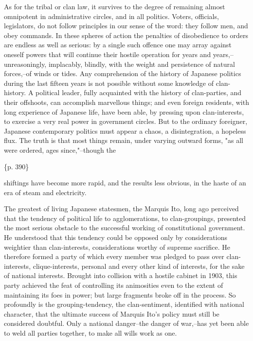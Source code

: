 As for the tribal or clan law, it survives to the degree of remaining almost omnipotent in administrative circles, and in all politics. Voters, officials, legislators, do not follow principles in our sense of the word: they follow men, and obey commands. In these spheres of action the penalties of disobedience to orders are endless as well as serious: by a single such offence one may array against oneself powers that will continue their hostile operation for years and years,--unreasoningly, implacably, blindly, with the weight and persistence of natural forces,--of winds or tides. Any comprehension of the history of Japanese politics during the last fifteen years is not possible without some knowledge of clan-history. A political leader, fully acquainted with the history of clan-parties, and their offshoots, can accomplish marvellous things; and even foreign residents, with long experience of Japanese life, have been able, by pressing upon clan-interests, to exercise a very real power in government circles. But to the ordinary foreigner, Japanese contemporary politics must appear a chaos, a disintegration, a hopeless flux. The truth is that most things remain, under varying outward forms, "as all were ordered, ages since,"--though the

\{p. 390\}

shiftings have become more rapid, and the results less obvious, in the haste of an era of steam and electricity.

The greatest of living Japanese statesmen, the Marquis Ito, long ago perceived that the tendency of political life to agglomerations, to clan-groupings, presented the most serious obstacle to the successful working of constitutional government. He understood that this tendency could be opposed only by considerations weightier than clan-interests, considerations worthy of supreme sacrifice. He therefore formed a party of which every member was pledged to pass over clan-interests, clique-interests, personal and every other kind of interests, for the sake of national interests. Brought into collision with a hostile cabinet in 1903, this party achieved the feat of controlling its animosities even to the extent of maintaining its foes in power; but large fragments broke off in the process. So profoundly is the grouping-tendency, the clan-sentiment, identified with national character, that the ultimate success of Marquis Ito's policy must still be considered doubtful. Only a national danger--the danger of war,--has yet been able to weld all parties together, to make all wills work as one.

